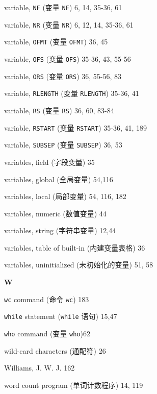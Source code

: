 \begin{multicols}{2}
\hangindent=2pc  variable, \verb'NF' (变量 \verb'NF')
6, 14, 35-36, 61

\hangindent=2pc  variable, \verb'NR' (变量 \verb'NR')
6, 12, 14, 35-36, 61

\hangindent=2pc  variable, \verb'OFMT' (变量 \verb'OFMT') 36, 45

\hangindent=2pc  variable, \verb'OFS' (变量 \verb'OFS')
35-36, 43, 55-56

\hangindent=2pc  variable, \verb'ORS' (变量 \verb'ORS') 36, 55-56, 83

\hangindent=2pc  variable, \verb'RLENGTH' (变量 \verb'RLENGTH')
35-36, 41

\hangindent=2pc  variable, \verb'RS' (变量 \verb'RS') 36, 60, 83-84

\hangindent=2pc  variable, \verb'RSTART' (变量 \verb'RSTART')
35-36, 41, 189

\hangindent=2pc  variable, \verb'SUBSEP' (变量 \verb'SUBSEP') 36, 53

\hangindent=2pc  variables, field (字段变量) 35

\hangindent=2pc  variables, global (全局变量) 54,116

\hangindent=2pc  variables, local (局部变量) 54, 116, 182

\hangindent=2pc  variables, numeric (数值变量) 44

\hangindent=2pc  variables, string (字符串变量) 12,44

\hangindent=2pc  variables, table of built-in (内建变量表格) 36

\hangindent=2pc  variables, uninitialized (未初始化的变量) 51, 58

\medskip\textbf{\large{W}}

\hangindent=2pc  \verb'wc' command (命令 \verb'wc') 183

\hangindent=2pc  \verb'while' statement (\verb'while' 语句) 15,47

\hangindent=2pc  \verb'who' command (变量 \verb'who')62

\hangindent=2pc  wild-card characters (通配符) 26

\hangindent=2pc  Williams, J. W. J. 162

\hangindent=2pc  word count program (单词计数程序) 14, 119


\end{multicols}
